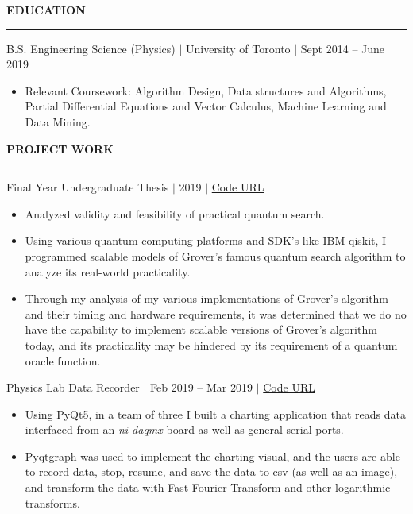 \documentclass[12pt]{article}
\newcommand{\sectionRule}{\textcolor{gray}{\rule{7.27in}{0.02cm}}}
\newcommand{\sectionTxt}[1]{\noindent\textbf{#1}\\}
\newcommand{\textDate}[3]{\noindent#1 $|$ #2 $|$ {\color{textGray} #3}}
\begin{document}
    \sectionTxt{EDUCATION}
    \sectionRule

    \textDate{B.S. Engineering Science (Physics)}{University of Toronto}{Sept 2014 -- June 2019}
    \begin{small}
        \begin{itemize}
            \itemsep0em 
            \item Relevant Coursework: {\color{textGray} Algorithm Design, Data structures and Algorithms, Partial Differential Equations and Vector Calculus, Machine Learning and Data Mining.}
        \end{itemize}
    \end{small}

    \sectionTxt{PROJECT WORK}
    \sectionRule

    \textDate{Final Year Undergraduate Thesis}{2019}{\href{https://github.com/Sammyalhashe/Thesis/tree/master/Grover}{Code URL}}
    \begin{small}
        \begin{itemize}
            \itemsep0em 
            \item {\color{textGray} Analyzed validity and feasibility of practical quantum search.}
            \item {\color{textGray} Using various quantum computing platforms and SDK's like IBM qiskit, I programmed scalable models of Grover's famous quantum search algorithm to analyze its real-world practicality.}
            \item {\color{textGray} Through my analysis of my various implementations of Grover's algorithm and their timing and hardware requirements, it was determined that we do no have the capability to implement scalable versions of Grover's algorithm today, and its practicality may be hindered by its requirement of a quantum oracle function.}
        \end{itemize}
    \end{small}

    \textDate{Physics Lab Data Recorder}{Feb 2019 -- Mar 2019}{\href{https://github.com/Sammyalhashe/Charter-cp}{Code URL}}
    \begin{small}
        \begin{itemize}
            \itemsep0em 
            \item {\color{textGray} Using PyQt5, in a team of three I built a charting application that reads data interfaced from an \textit{ni daqmx} board as well as general serial ports.}
            \item {\color{textGray} Pyqtgraph was used to implement the charting visual, and the users are able to record data, stop, resume, and save the data to csv (as well as an image), and transform the data with Fast Fourier Transform and other logarithmic transforms.}
        \end{itemize}
    \end{small}
\end{document}
